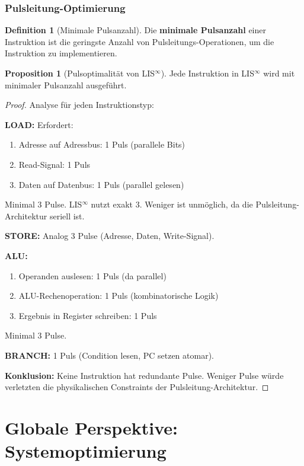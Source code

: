\documentclass[a4paper,12pt]{article}
\theoremstyle{definition}
\newtheorem{definition}{Definition}
\newtheorem{proposition}{Proposition}
\begin{document}
\subsubsection[Pulsleitung-Optimierung]{Pulsleitung-Optimierung}

\begin{definition}[Minimale Pulsanzahl]
	Die \textbf{minimale Pulsanzahl} einer Instruktion ist die geringste Anzahl von Pulsleitungs-Operationen, um die Instruktion zu implementieren.
\end{definition}

\begin{proposition}[Pulsoptimalität von LIS$^{\infty}$]
	\label{prop:puls_optimal}
	Jede Instruktion in LIS$^{\infty}$ wird mit minimaler Pulsanzahl ausgeführt.
\end{proposition}

\begin{proof}
	Analyse für jeden Instruktionstyp:
	
	\textbf{LOAD:} Erfordert:
	\begin{enumerate}
		\item Adresse auf Adressbus: 1 Puls (parallele Bits)
		\item Read-Signal: 1 Puls
		\item Daten auf Datenbus: 1 Puls (parallel gelesen)
	\end{enumerate}
	Minimal 3 Pulse. LIS$^{\infty}$ nutzt exakt 3. Weniger ist unmöglich, da die Pulsleitung-Architektur seriell ist.
	
	\textbf{STORE:} Analog 3 Pulse (Adresse, Daten, Write-Signal).
	
	\textbf{ALU:} 
	\begin{enumerate}
		\item Operanden auslesen: 1 Puls (da parallel)
		\item ALU-Rechenoperation: 1 Puls (kombinatorische Logik)
		\item Ergebnis in Register schreiben: 1 Puls
	\end{enumerate}
	Minimal 3 Pulse.
	
	\textbf{BRANCH:} 1 Puls (Condition lesen, PC setzen atomar).
	
	\textbf{Konklusion:} Keine Instruktion hat redundante Pulse. Weniger Pulse würde verletzten die physikalischen Constraints der Pulsleitung-Architektur.
\end{proof}

\section{Globale Perspektive: Systemoptimierung}
\end{document}
